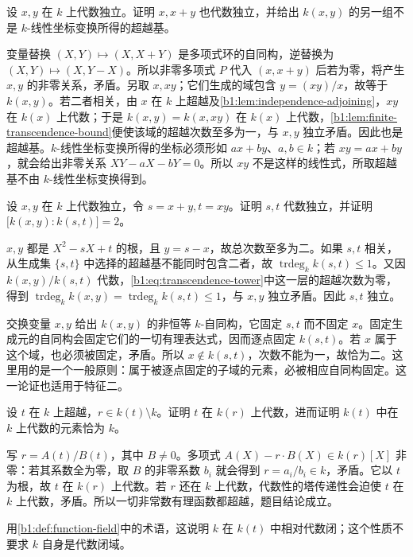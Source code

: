 \begin{exercise}\label{b1:ex:14-8}
	设 \(x,y\) 在 \(k\) 上代数独立。证明 \(x,x+y\) 也代数独立，并给出 \(k(x,y)\) 的另一组不是 \(k\)-线性坐标变换所得的超越基。
\end{exercise}
\begin{solution}
	变量替换 \((X,Y)\mapsto(X,X+Y)\) 是多项式环的自同构，逆替换为 \((X,Y)\mapsto(X,Y-X)\)。所以非零多项式 \(P\) 代入 \((x,x+y)\) 后若为零，将产生 \(x,y\) 的非零关系，矛盾。另取 \(x,xy\)；它们生成的域包含 \(y=(xy)/x\)，故等于 \(k(x,y)\)。若二者相关，由 \(x\) 在 \(k\) 上超越及\cref{b1:lem:independence-adjoining}，\(xy\) 在 \(k(x)\) 上代数；于是 \(k(x,y)=k(x,xy)\) 在 \(k(x)\) 上代数，\cref{b1:lem:finite-transcendence-bound}便使该域的超越次数至多为一，与 \(x,y\) 独立矛盾。因此也是超越基。\(k\)-线性坐标变换所得的坐标必须形如 \(ax+by\)、\(a,b\in k\)；若 \(xy=ax+by\)，就会给出非零关系 \(XY-aX-bY=0\)。所以 \(xy\) 不是这样的线性式，所取超越基不由 \(k\)-线性坐标变换得到。
\end{solution}

\begin{exercise}\label{b1:ex:14-9}
	设 \(x,y\) 在 \(k\) 上代数独立，令 \(s=x+y,t=xy\)。证明 \(s,t\) 代数独立，并证明 \(\bigl[k(x,y):k(s,t)\bigr]=2\)。
\end{exercise}
\begin{solution}
	\(x,y\) 都是 \(X^2-sX+t\) 的根，且 \(y=s-x\)，故总次数至多为二。如果 \(s,t\) 相关，从生成集 \(\{s,t\}\) 中选择的超越基不能同时包含二者，故 \(\operatorname{trdeg}_k k(s,t)\leq1\)。又因 \(k(x,y)/k(s,t)\) 代数，\eqref{b1:eq:transcendence-tower}中这一层的超越次数为零，得到 \(\operatorname{trdeg}_k k(x,y)=\operatorname{trdeg}_k k(s,t)\leq1\)，与 \(x,y\) 独立矛盾。因此 \(s,t\) 独立。

	交换变量 \(x,y\) 给出 \(k(x,y)\) 的非恒等 \(k\)-自同构，它固定 \(s,t\) 而不固定 \(x\)。固定生成元的自同构会固定它们的一切有理表达式，因而逐点固定 \(k(s,t)\)。若 \(x\) 属于这个域，也必须被固定，矛盾。所以 \(x\notin k(s,t)\)，次数不能为一，故恰为二。这里用的是一个一般原则：属于被逐点固定的子域的元素，必被相应自同构固定。这一论证也适用于特征二。
\end{solution}

\begin{exercise}\label{b1:ex:14-10}
	设 \(t\) 在 \(k\) 上超越，\(r\in k(t)\setminus k\)。证明 \(t\) 在 \(k(r)\) 上代数，进而证明 \(k(t)\) 中在 \(k\) 上代数的元素恰为 \(k\)。
\end{exercise}
\begin{solution}
	写 \(r=A(t)/B(t)\)，其中 \(B\neq0\)。多项式 \(A(X)-r\cdot B(X)\in k(r)[X]\) 非零：若其系数全为零，取 \(B\) 的非零系数 \(b_i\) 就会得到 \(r=a_i/b_i\in k\)，矛盾。它以 \(t\) 为根，故 \(t\) 在 \(k(r)\) 上代数。若 \(r\) 还在 \(k\) 上代数，代数性的塔传递性会迫使 \(t\) 在 \(k\) 上代数，矛盾。所以一切非常数有理函数都超越，题目结论成立。

	用\cref{b1:def:function-field}中的术语，这说明 \(k\) 在 \(k(t)\) 中相对代数闭；这个性质不要求 \(k\) 自身是代数闭域。
\end{solution}

